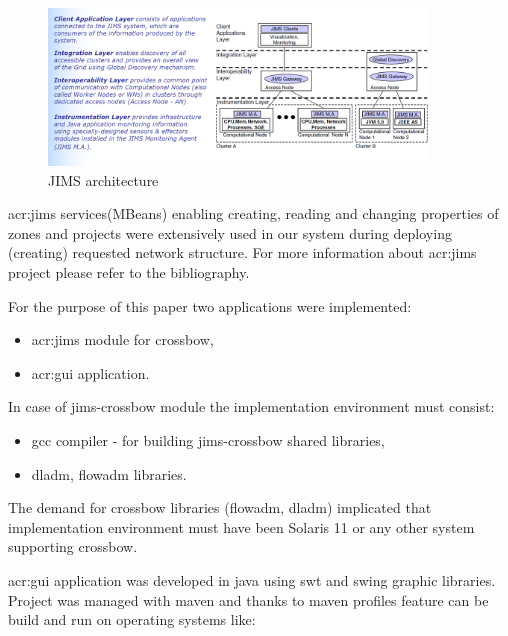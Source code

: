 \documentclass[11pt]{book}
\begin{document}
      \begin{figure}[H]
        \begin{center}
          \includegraphics[width=0.9\textwidth]{img/jims/jims.png}
        \end{center}
        \caption{JIMS architecture \cite{jims}}
      \end{figure}
	 
      \gls{acr:jims} services(MBeans) enabling creating, reading and changing properties of zones and projects were
      extensively used in our system during deploying (creating) requested network structure. For more information about
      \gls{acr:jims} project please refer to the bibliography.	
    
      \medskip
	
      For the purpose of this paper two applications were implemented:
	
      \begin{itemize}
        \item \gls{acr:jims} module for crossbow,
        \item \gls{acr:gui} application.
      \end{itemize}
	  
	  \medskip
	
      In case of jims-crossbow module the implementation environment must consist:

      \begin{itemize}
        \item gcc compiler - for building jims-crossbow shared libraries,
        \item dladm, flowadm libraries.
      \end{itemize}
	
      The demand for crossbow libraries (flowadm, dladm) implicated that implementation environment must have been
      Solaris 11 or any other system supporting crossbow.
    
      \gls{acr:gui} application was developed in java using swt and swing graphic libraries. Project was managed with
      maven and thanks to maven profiles feature can be build and run on operating systems like:
\end{document}
